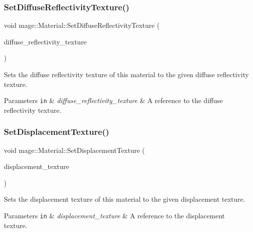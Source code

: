 \subsubsection{\texorpdfstring{Set\+Diffuse\+Reflectivity\+Texture()}{SetDiffuseReflectivityTexture()}}
{\footnotesize\ttfamily void mage\+::\+Material\+::\+Set\+Diffuse\+Reflectivity\+Texture (\begin{DoxyParamCaption}\item[{const \hyperlink{namespacemage_a1e01ae66713838a7a67d30e44c67703e}{Shared\+Ptr}$<$ const \hyperlink{classmage_1_1_texture}{Texture} $>$ \&}]{diffuse\+\_\+reflectivity\+\_\+texture }\end{DoxyParamCaption})}

Sets the diffuse reflectivity texture of this material to the given diffuse reflectivity texture.


\begin{DoxyParams}[1]{Parameters}
\mbox{\tt in}  & {\em diffuse\+\_\+reflectivity\+\_\+texture} & A reference to the diffuse reflectivity texture. \\
\hline
\end{DoxyParams}
\hypertarget{structmage_1_1_material_ab1033bb2d635960a6dc6117d71866d28}{}\label{structmage_1_1_material_ab1033bb2d635960a6dc6117d71866d28} 
\subsubsection{\texorpdfstring{Set\+Displacement\+Texture()}{SetDisplacementTexture()}}
{\footnotesize\ttfamily void mage\+::\+Material\+::\+Set\+Displacement\+Texture (\begin{DoxyParamCaption}\item[{const \hyperlink{namespacemage_a1e01ae66713838a7a67d30e44c67703e}{Shared\+Ptr}$<$ const \hyperlink{classmage_1_1_texture}{Texture} $>$ \&}]{displacement\+\_\+texture }\end{DoxyParamCaption})}

Sets the displacement texture of this material to the given displacement texture.


\begin{DoxyParams}[1]{Parameters}
\mbox{\tt in}  & {\em displacement\+\_\+texture} & A reference to the displacement texture. \\
\hline
\end{DoxyParams}
\hypertarget{structmage_1_1_material_ac388828669d98c9fb336b292efc7c48d}{}\label{structmage_1_1_material_ac388828669d98c9fb336b292efc7c48d} 
